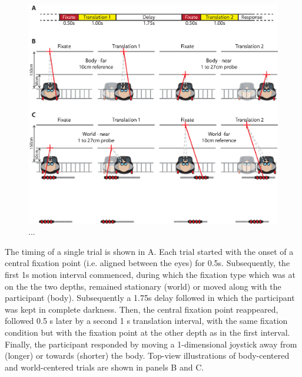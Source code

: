 \begin{figure}
    \includegraphics[width=1.0\textwidth]{src/paper4/paper4_figure1.eps}

    \caption{...}
    \label{p4:fig1}    
\end{figure}
 
The timing of a single trial is shown in A. Each trial started with the onset of a central fixation point (i.e. aligned between the eyes) for 0.5s. Subsequently, the first 1s motion interval commenced, during which the fixation type which was at on the the two depths, remained stationary (world) or moved along with the participant (body). Subsequently a 1.75s delay followed in which the participant was kept in complete darkness. Then, the central fixation point reappeared, followed 0.5 \si{\second} later by a second 1 \si{\second} translation interval, with the same fixation condition but with the fixation point at the other depth as in the first interval. Finally, the participant responded by moving a 1-dimensional joystick away from (longer) or towards (shorter) the body. Top-view illustrations of body-centered and world-centered trials are shown in  panels B and C.

